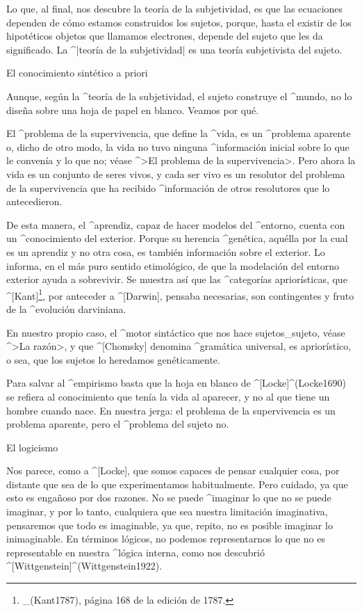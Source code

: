 
Lo que, al final, nos descubre la teoría de la subjetividad, es que las
ecuaciones dependen de cómo estamos construidos los sujetos, porque,
hasta el existir de los hipotéticos objetos que llamamos electrones,
depende del sujeto que les da significado. La ^|teoría de la
subjetividad| es una teoría subjetivista del sujeto.


\Section El conocimiento sintético a priori

Aunque, según la ^{teoría de la subjetividad}, el sujeto construye el
^{mundo}, no lo diseña sobre una hoja de papel en blanco. Veamos por
qué.

El ^{problema de la supervivencia}, que define la ^{vida}, es un
^{problema aparente} o, dicho de otro modo, la vida no tuvo ninguna
^{información} inicial sobre lo que le convenía y lo que no; véase ^>El
problema de la supervivencia>. Pero ahora la vida es un conjunto de
seres vivos, y cada ser vivo es un resolutor del problema de la
supervivencia que ha recibido ^{información} de otros resolutores que lo
antecedieron.

De esta manera, el ^{aprendiz}, capaz de hacer modelos del ^{entorno},
cuenta con un ^{conocimiento}  del exterior. Porque su
herencia ^{genética}, aquélla por la cual es un aprendiz y no otra cosa,
es también información sobre el exterior. Lo informa, en el más puro
sentido etimológico, de que la modelación del entorno exterior ayuda a
sobrevivir. Se muestra así que las ^{categorías} apriorísticas, que
^[Kant]\footnote{_(Kant1787), página 168 de la edición de 1787.}, por
anteceder a ^[Darwin], pensaba necesarias, son contingentes y fruto de
la ^{evolución} darviniana.

En nuestro propio caso, el ^{motor sintáctico} que nos hace
sujetos_{sujeto}, véase ^>La razón>, y que ^[Chomsky] denomina
^{gramática universal}, es apriorístico, o sea, que los sujetos lo
heredamos genéticamente.

Para salvar al ^{empirismo} basta que la hoja en blanco de
^[Locke]^(Locke1690) se refiera al conocimiento que tenía la vida al
aparecer, y no al que tiene un hombre cuando nace. En nuestra jerga: el
problema de la supervivencia es un problema aparente, pero el ^{problema
del sujeto} no.


\Section El logicismo

Nos parece, como a ^[Locke], que somos capaces de pensar cualquier cosa,
por distante que sea de lo que experimentamos habitualmente. Pero
cuidado, ya que esto es engañoso por dos razones.
\beginpoints
\point No se puede ^{imaginar} lo que no se puede imaginar, y por lo
tanto, cualquiera que sea nuestra limitación imaginativa, pensaremos que
todo es imaginable, ya que, repito, no es posible imaginar lo
inimaginable. En términos lógicos, no podemos representarnos lo que no
es representable en nuestra ^{lógica interna}, como nos descubrió
^[Wittgenstein]^(Wittgenstein1922).

